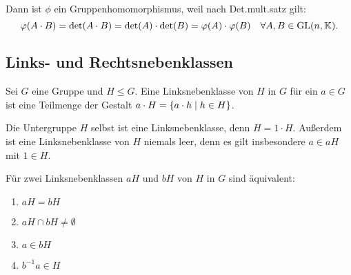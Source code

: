 {\begin{example}
  Dann ist $\phi$ ein Gruppenhomomorphismus, weil nach Det.mult.satz gilt:
  \[\phi(A \cdot B) = \det(A \cdot B) = \det(A) \cdot \det(B) = \phi(A) \cdot \phi(B) \quad \forall A,B \in \GL(n,\KK).\]
\end{example}

\subsection{Links- und Rechtsnebenklassen}

\begin{definition}[Linksnebenklasse]
  Sei $G$ eine Gruppe und $H \leq G$. Eine Linksnebenklasse von $H$ in $G$ für ein $a \in G$ ist eine Teilmenge der Gestalt $a \cdot H = \left\{ a \cdot h \suchthat h \in H \right\}$.
\end{definition}

\begin{remark}
  Die Untergruppe $H$ selbst ist eine Linksnebenklasse, denn $H = 1 \cdot H$. Außerdem ist eine Linksnebenklasse von $H$ niemals leer, denn es gilt insbesondere $a \in aH$ mit $1 \in H$.
\end{remark}

\begin{lemma}[Linksnebenklassen]
  Für zwei Linksnebenklassen $aH$ und $bH$ von $H$ in $G$ sind äquivalent:
  \begin{enumerate}[label=\alph*)]
    \item $aH = bH$
    \item $aH \cap bH \neq \emptyset$
    \item $a \in bH$
    \item $b^{-1}a \in H$
  \end{enumerate}
\end{lemma}

}
